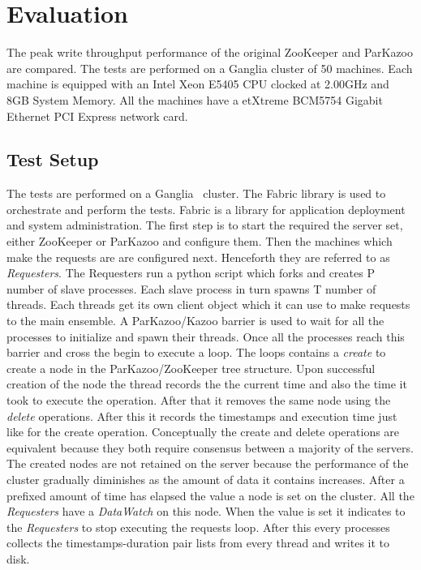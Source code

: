 \chapter{Evaluation}

The peak write throughput performance of the original ZooKeeper and ParKazoo are compared. The tests are performed on a Ganglia cluster of 50 machines. Each machine is equipped with an Intel\textsuperscript{\textregistered}  Xeon\textsuperscript{\texttrademark}  E5405 CPU clocked at 2.00GHz and 8GB System Memory. All the machines have a etXtreme BCM5754 Gigabit Ethernet PCI Express network card.

\section{Test Setup}
The tests are performed on a Ganglia~\cite{sacerdoti2003wide} cluster. The Fabric library is used to orchestrate and perform the tests. Fabric is a library for application deployment~\cite{spotswood2003systems} and system administration. The first step is to start the required the server set, either ZooKeeper or ParKazoo and configure them. Then the machines which make the requests are are configured next. Henceforth they are referred to as \textit{Requesters}. The Requesters run a python script which forks and creates P number of slave processes. Each slave process in turn spawns T number of threads. Each threads get its own client object which it can use to make requests to the main ensemble. A ParKazoo/Kazoo barrier is used to wait for all the processes to initialize and spawn their threads. Once all the processes reach this barrier and cross the begin to execute a loop. The loops contains a \textit{create} to create a node in the ParKazoo/ZooKeeper tree structure. Upon successful creation of the node the thread records the the current time and also the time it took to execute the operation. After that it removes the same node using the \textit{delete} operations. After this it records the timestamps and execution time just like for the create operation. Conceptually the create and delete operations are equivalent because they both require consensus between a majority of the servers. The created nodes are not retained on the server because the performance of the cluster gradually diminishes as the amount of data it contains increases. After a prefixed amount of time has elapsed the value a node is set on the cluster. All the \textit{Requesters} have a \textit{DataWatch} on this node. When the value is set it indicates to the \textit{Requesters} to stop executing the requests loop. After this every processes collects the timestamps-duration pair lists from every thread and writes it to disk. 

